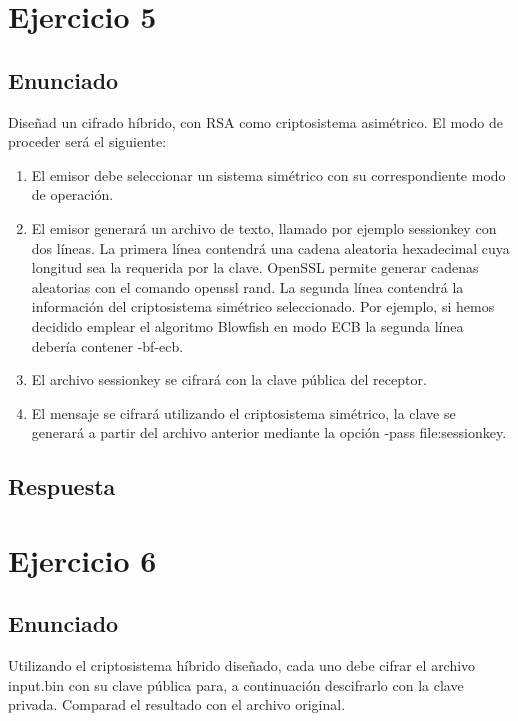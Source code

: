 \documentclass[10pt,a4paper,spanish]{report}
\begin{document}
\chapter{Ejercicio 5}

\section{Enunciado}
\noindent
Diseñad un cifrado híbrido, con RSA como criptosistema asimétrico. El modo de proceder será el siguiente:
\begin{enumerate}
 \item El emisor debe seleccionar un sistema simétrico con su correspondiente modo de operación.
 \item El emisor generará un archivo de texto, llamado por ejemplo sessionkey con dos líneas. La primera línea contendrá una cadena aleatoria hexadecimal cuya longitud sea la requerida por la clave. OpenSSL permite generar cadenas aleatorias con el comando openssl rand. La segunda línea contendrá la información del criptosistema simétrico seleccionado. Por ejemplo, si hemos decidido emplear el algoritmo Blowfish en modo ECB la segunda línea debería contener -bf-ecb.
 \item El archivo sessionkey se cifrará con la clave pública del receptor.
 \item El mensaje se cifrará utilizando el criptosistema simétrico, la clave se generará a partir del archivo anterior mediante la opción -pass file:sessionkey.
\end{enumerate}

\section{Respuesta}
\noindent

\chapter{Ejercicio 6}

\section{Enunciado}
\noindent
Utilizando el criptosistema híbrido diseñado, cada uno debe cifrar el archivo input.bin con su clave pública para, a continuación descifrarlo con la clave privada. Comparad el resultado con el archivo original.
\end{document}
